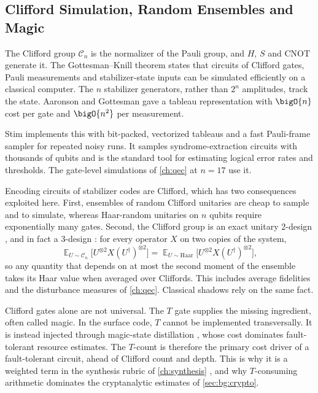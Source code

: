 \subsection{Clifford Simulation, Random Ensembles and Magic}

The Clifford group $\mathcal{C}_n$ is the normalizer of the Pauli group, and $H$, $S$ and CNOT generate it. The Gottesman--Knill theorem states that circuits of Clifford gates, Pauli measurements and stabilizer-state inputs can be simulated efficiently on a classical computer. The $n$ stabilizer generators, rather than $2^n$ amplitudes, track the state. Aaronson and Gottesman \cite{aaronson2004stabilizer} gave a tableau representation with $\bigO{n}$ cost per gate and $\bigO{n^2}$ per measurement.

Stim \cite{gidney2021stim} implements this with bit-packed, vectorized tableaus and a fast Pauli-frame sampler for repeated noisy runs. It samples syndrome-extraction circuits with thousands of qubits and is the standard tool for estimating logical error rates and thresholds. The gate-level simulations of \cref{ch:qec} at $n=17$ use it.

Encoding circuits of stabilizer codes are Clifford, which has two consequences exploited here. First, ensembles of random Clifford unitaries are cheap to sample and to simulate, whereas Haar-random unitaries on $n$ qubits require exponentially many gates. Second, the Clifford group is an exact unitary 2-design \cite{dankert2009designs}, and in fact a 3-design \cite{webb2016clifford3design}: for every operator $X$ on two copies of the system,
\begin{equation}\label{eq:bg:design}
\mathop{\mathbb{E}}_{U\sim\mathcal{C}_n}\bigl[U^{\otimes2}X(U^{\dagger})^{\otimes2}\bigr]=\mathop{\mathbb{E}}_{U\sim\mathrm{Haar}}\bigl[U^{\otimes2}X(U^{\dagger})^{\otimes2}\bigr],
\end{equation}
so any quantity that depends on at most the second moment of the ensemble takes its Haar value when averaged over Cliffords. This includes average fidelities and the disturbance measures of \cref{ch:qec}. Classical shadows \cite{huang2020shadows} rely on the same fact.

Clifford gates alone are not universal. The $T$ gate supplies the missing ingredient, often called magic. In the surface code, $T$ cannot be implemented transversally. It is instead injected through magic-state distillation \cite{bravyi2005magic}, whose cost dominates fault-tolerant resource estimates. The $T$-count is therefore the primary cost driver of a fault-tolerant circuit, ahead of Clifford count and depth. This is why it is a weighted term in the synthesis rubric of \cref{ch:synthesis} \cite{guo2026rubriq}, and why $T$-consuming arithmetic dominates the cryptanalytic estimates of \cref{sec:bg:crypto}.

